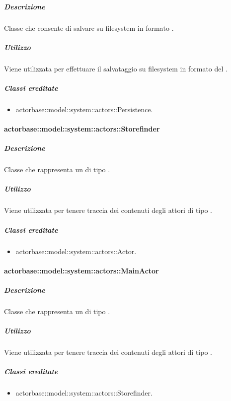 \documentclass{scalatekids-article}
\begin{document}
\subparagraph{Descrizione}

Classe che consente di salvare su filesystem in formato .

\subparagraph{Utilizzo}

Viene utilizzata per effettuare il salvataggio su filesystem in formato
 del .

\subparagraph{Classi ereditate}

\begin{itemize}
\item actorbase::model::system::actors::Persistence.
\end{itemize}

\paragraph{actorbase::model::system::actors::Storefinder}

\subparagraph{Descrizione}

Classe che rappresenta un  di tipo .

\subparagraph{Utilizzo}

Viene utilizzata per tenere traccia dei contenuti degli attori di tipo
.

\subparagraph{Classi ereditate}

\begin{itemize}
\item actorbase::model::system::actors::Actor.
\end{itemize}

\paragraph{actorbase::model::system::actors::MainActor}

\subparagraph{Descrizione}

Classe che rappresenta un  di tipo .

\subparagraph{Utilizzo}

Viene utilizzata per tenere traccia dei contenuti degli attori di tipo
.

\subparagraph{Classi ereditate}

\begin{itemize}
\item actorbase::model::system::actors::Storefinder.
\end{itemize}
\end{document}
